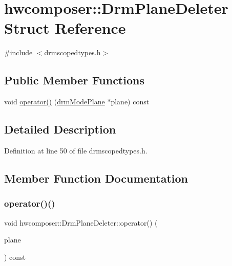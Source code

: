 \hypertarget{structhwcomposer_1_1DrmPlaneDeleter}{}\section{hwcomposer\+:\+:Drm\+Plane\+Deleter Struct Reference}
\label{structhwcomposer_1_1DrmPlaneDeleter}


{\ttfamily \#include $<$drmscopedtypes.\+h$>$}

\subsection*{Public Member Functions}
\begin{DoxyCompactItemize}
\item 
void \mbox{\hyperlink{structhwcomposer_1_1DrmPlaneDeleter_ab7ca49d08c4397de86e270144c1b89de}{operator()}} (\mbox{\hyperlink{drmscopedtypes_8h_a41627c0f0f83a8fc263e592ae28ae6b4}{drm\+Mode\+Plane}} $\ast$plane) const
\end{DoxyCompactItemize}


\subsection{Detailed Description}


Definition at line 50 of file drmscopedtypes.\+h.



\subsection{Member Function Documentation}
\mbox{\label{structhwcomposer_1_1DrmPlaneDeleter_ab7ca49d08c4397de86e270144c1b89de}} 
\subsubsection{\texorpdfstring{operator()()}{operator()()}}
{\footnotesize\ttfamily void hwcomposer\+::\+Drm\+Plane\+Deleter\+::operator() (\begin{DoxyParamCaption}\item[{\mbox{\hyperlink{drmscopedtypes_8h_a41627c0f0f83a8fc263e592ae28ae6b4}{drm\+Mode\+Plane}} $\ast$}]{plane }\end{DoxyParamCaption}) const}



